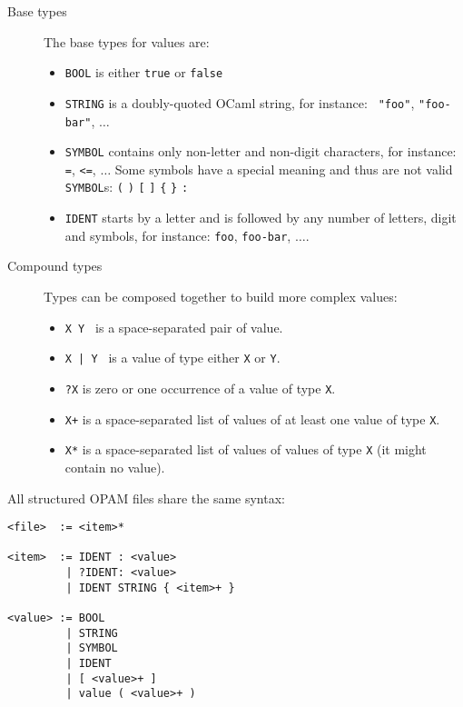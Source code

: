 \documentclass[a4paper,11pt]{article}
\begin{document}
\begin{description}

\item[Base types] The base types for values are:

\begin{itemize}
\item {\tt BOOL} is  either {\tt true} or {\tt false}
\item {\tt STRING} is a doubly-quoted OCaml string, for instance: {\tt
  "foo"}, {\tt "foo-bar"}, $\ldots$
\item {\tt SYMBOL} contains only non-letter and non-digit characters,
  for instance: {\tt =}, {\tt <=}, $\ldots$ Some symbols have a special
  meaning and thus are not valid {\tt SYMBOL}s: \verb+(+ \verb+)+
  \verb+[+ \verb+]+ \verb+{+ \verb+}+ \verb+:+
\item {\tt IDENT} starts by a letter and is followed by any number of
  letters, digit and symbols, for instance: {\tt foo}, {\tt foo-bar},
  $\ldots$. 
\end{itemize}


\item[Compound types] Types can be composed together to build more
  complex values:

\begin{itemize}
\item {\tt X Y } is a space-separated pair of value.
\item {\tt X | Y } is a value of type either {\tt X} or {\tt Y}.
\item {\tt ?X} is zero or one occurrence of a value of type {\tt X}.
\item {\tt X+} is a space-separated list of values of at least one value
  of type {\tt X}.
\item {\tt X*} is a space-separated list of values of values of type
  {\tt X} (it might contain no value).
\end{itemize}

\end{description}

All structured OPAM files share the same syntax:

{\small
\begin{Verbatim}[frame=single]
<file>  := <item>*

<item>  := IDENT : <value>
         | ?IDENT: <value>
         | IDENT STRING { <item>+ }

<value> := BOOL
         | STRING
         | SYMBOL
         | IDENT
         | [ <value>+ ]
         | value ( <value>+ )
\end{Verbatim}
}
\end{document}
